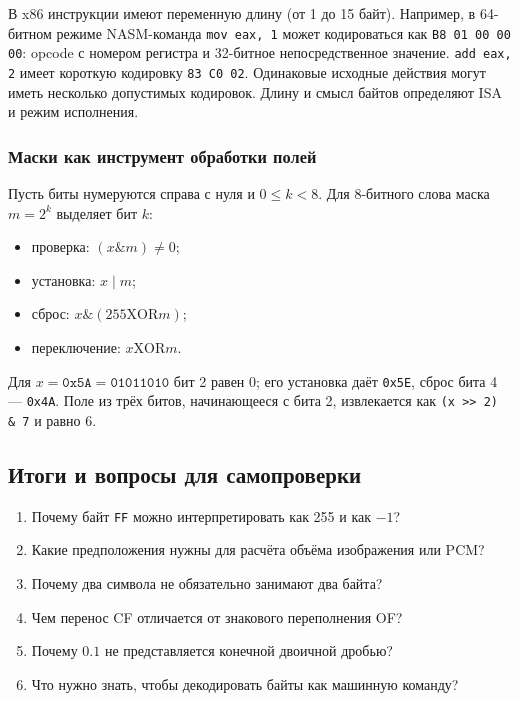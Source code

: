 В x86 инструкции имеют переменную длину (от 1 до 15 байт).
Например, в 64-битном режиме NASM-команда \texttt{mov eax, 1}
может кодироваться как \texttt{B8 01 00 00 00}:
opcode с номером регистра и 32-битное непосредственное значение.
\texttt{add eax, 2} имеет короткую кодировку \texttt{83 C0 02}.
Одинаковые исходные действия могут иметь несколько допустимых кодировок.
Длину и смысл байтов определяют ISA и режим исполнения.

\subsubsection*{Маски как инструмент обработки полей}
Пусть биты нумеруются справа с нуля и $0\le k<8$.
Для 8-битного слова маска $m=2^k$ выделяет бит $k$:
\begin{itemize}
    \item проверка: $(x\mathbin{\&}m)\ne0$;
    \item установка: $x\mathbin{|}m$;
    \item сброс: $x\mathbin{\&}(255\mathbin{\mathrm{XOR}}m)$;
    \item переключение: $x\mathbin{\mathrm{XOR}}m$.
\end{itemize}
Для $x=\texttt{0x5A}=\texttt{01011010}$ бит 2 равен 0;
его установка даёт \texttt{0x5E}, сброс бита 4 --- \texttt{0x4A}.
Поле из трёх битов, начинающееся с бита 2, извлекается как
\texttt{(x >> 2) \& 7} и равно 6.

\subsection*{Итоги и вопросы для самопроверки}
\begin{enumerate}
    \item Почему байт \texttt{FF} можно интерпретировать как 255 и как $-1$?
    \item Какие предположения нужны для расчёта объёма изображения или PCM?
    \item Почему два символа не обязательно занимают два байта?
    \item Чем перенос CF отличается от знакового переполнения OF?
    \item Почему $0.1$ не представляется конечной двоичной дробью?
    \item Что нужно знать, чтобы декодировать байты как машинную команду?
\end{enumerate}
